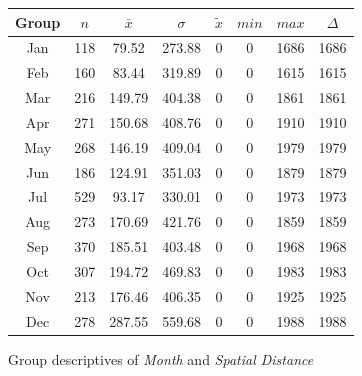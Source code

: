 \begin{figure}[ht!]
	\centering
	\begin{minipage}{0.5\textwidth}
		\tiny
		\setlength{\tabcolsep}{4pt}
		\centering
		\begin{tabular}{c|c|c|c|c|c|c|c}
			\toprule
			Group & $n$ & $\bar{x}$ & $\sigma$ & $\tilde{x}$ & $min$ & $max$ & $\Delta$ \\
			\midrule
			Jan & 118 & 79.52  & 273.88 & 0 & 0 & 1686 & 1686 \\ 
			Feb & 160 & 83.44  & 319.89 & 0 & 0 & 1615 & 1615 \\ 
			Mar & 216 & 149.79 & 404.38 & 0 & 0 & 1861 & 1861 \\ 
			Apr & 271 & 150.68 & 408.76 & 0 & 0 & 1910 & 1910 \\ 
			May & 268 & 146.19 & 409.04 & 0 & 0 & 1979 & 1979 \\ 
			Jun & 186 & 124.91 & 351.03 & 0 & 0 & 1879 & 1879 \\ 
			Jul & 529 & 93.17  & 330.01 & 0 & 0 & 1973 & 1973 \\ 
			Aug & 273 & 170.69 & 421.76 & 0 & 0 & 1859 & 1859 \\ 
			Sep & 370 & 185.51 & 403.48 & 0 & 0 & 1968 & 1968 \\ 
			Oct & 307 & 194.72 & 469.83 & 0 & 0 & 1983 & 1983 \\ 
			Nov & 213 & 176.46 & 406.35 & 0 & 0 & 1925 & 1925 \\ 
			Dec & 278 & 287.55 & 559.68 & 0 & 0 & 1988 & 1988 \\ 
			\bottomrule
		\end{tabular}
		\label{tbl:descriptives_arbis_matched_Month_SDist}
	\end{minipage}%
	\begin{minipage}{0.55\textwidth}
		\tiny
		\centering
		\vfill
		\label{fig:descriptives_arbis_matched_Month_SDist}
	\end{minipage}%
	\caption{Group descriptives of \textit{Month} and \textit{Spatial Distance}}
\end{figure}
